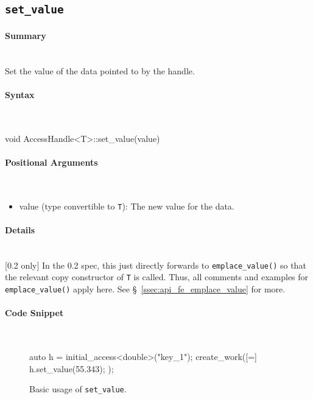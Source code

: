 \subsection{\texttt{set\_value}}

\paragraph{Summary} \mbox{}\\
Set the value of the data pointed to by the handle.

\paragraph{Syntax} \mbox{}\\
\begin{CppCode}
void AccessHandle<T>::set_value(value)
\end{CppCode}

\paragraph{Positional Arguments}\mbox{}\\
\begin{itemize}
  \item value (type convertible to \texttt{T}): The new value for the data.
\end{itemize}

\paragraph{Details}\mbox{}\\
{\color{red}[0.2 only]} In the 0.2 spec, this just directly forwards to
\texttt{emplace\_value()} so that the relevant copy constructor of {\tt T} is
called.  Thus, all comments and examples for \texttt{emplace\_value()} apply
here.  See \S~\ref{ssec:api_fe_emplace_value} for more.


\paragraph{Code Snippet}\mbox{}\\
\begin{figure}[!h]
\begin{CppCodeNumb}
auto h = initial_access<double>("key_1");
create_work([=]{
  h.set_value(55.343);
});
\end{CppCodeNumb}
\label{fig:fe_api_set_value}
\caption{Basic usage of \texttt{set\_value}.}
\end{figure}

